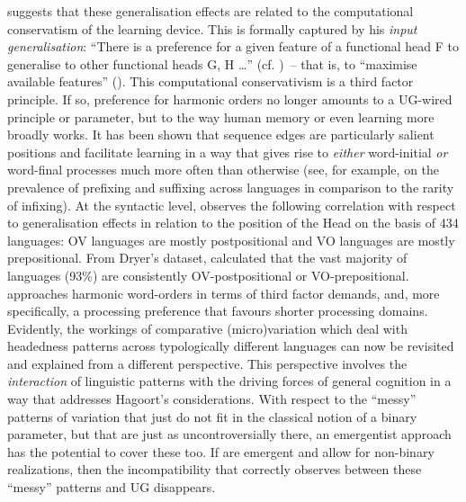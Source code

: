 \documentclass[output=paper]{langsci/langscibook}
\begin{document}
\citet{Roberts2016} suggests that these generalisation effects are related to
the computational conservatism of the learning device. This is formally
captured by his \emph{input generalisation}: “There is a preference for a
given feature of a functional head F to generalise to other functional heads G,
H \dots{}” (cf. \citealt[275]{Roberts2007})~-- that is, to “maximise available
features” (\citealt{BibRob2016b,Roberts2016}). This computational
conservativism is a third factor principle. If so, preference for harmonic
orders no longer amounts to a \gls{UG}-wired principle or parameter, but to the
way human memory or even learning more broadly works. It has been shown that
sequence edges are particularly salient positions and facilitate learning in a
way that gives rise to \emph{either} word-initial \emph{or} word-final
processes much more often than otherwise (see, for example,
\citealt{EndressEtAl2009} on the prevalence of prefixing and suffixing across
languages in comparison to the rarity of infixing). At the syntactic level,
\citet{Dryer1992} observes the following correlation with respect to
generalisation effects in relation to the position of the Head on the basis of
434 languages: OV languages are mostly postpositional and VO languages are
mostly prepositional. From Dryer’s dataset, \citet{Hawkins2010} calculated that
the vast majority of languages (93\%) are consistently OV-postpositional or
VO-prepositional. \citet{Hawkins2010} approaches harmonic word-orders in terms
of third factor demands, and, more specifically, a processing preference that
favours shorter processing domains. Evidently, the workings of comparative
(micro)variation which deal with headedness patterns across typologically
different languages can now be revisited and explained from a different
perspective. This perspective involves the \emph{interaction} of linguistic
patterns with the driving forces of general cognition in a way that addresses
Hagoort’s considerations. With respect to the “messy” patterns of variation
that just do not fit in the classical notion of a binary parameter, but that
are just as uncontroversially there, an emergentist approach has the potential
to cover these too. If  are emergent and allow for non-binary
realizations, then the incompatibility that \citet{Yang2004} correctly observes
between these “messy” patterns and \gls{UG} disappears.
\end{document}
